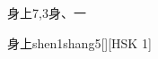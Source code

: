 \begin{entry}{身上}{7,3}{⾝、⼀}
  \begin{phonetics}{身上}{shen1shang5}[][HSK 1]
  \end{phonetics}
\end{entry}
